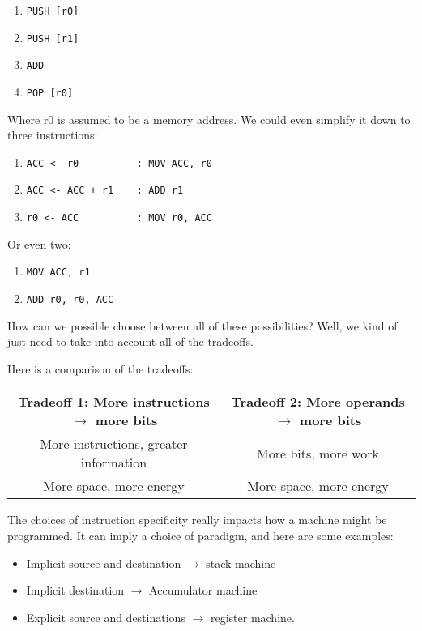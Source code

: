 \documentclass[11pt,a4paper,titlepage,dvipsnames,cmyk]{scrartcl}
\begin{document}
\begin{enumerate}
    \item \lstinline|PUSH [r0]| 
    \item \lstinline|PUSH [r1]| 
    \item \lstinline|ADD| 
    \item \lstinline|POP [r0]| 
\end{enumerate}

Where r0 is assumed to be a memory address. We could even simplify it down
to three instructions:

\begin{enumerate}
    \item \lstinline|ACC <- r0          : MOV ACC, r0|
    \item \lstinline|ACC <- ACC + r1    : ADD r1| 
    \item \lstinline|r0 <- ACC          : MOV r0, ACC| 
\end{enumerate}

Or even two:

\begin{enumerate}
    \item \lstinline|MOV ACC, r1| 
    \item \lstinline|ADD r0, r0, ACC| 
\end{enumerate}

How can we possible choose between all of these possibilities? Well, we
kind of just need to take into account all of the tradeoffs.

Here is a comparison of the tradeoffs:

\begin{center}
    \begin{tabular}{c|c}
        \textbf{Tradeoff 1: More instructions $\rightarrow$ more bits} &
        \textbf{Tradeoff 2: More operands $\rightarrow$ more bits} \\ \hhline{=|=}
        More instructions, greater information & More bits, more work \\
        \hline
        More space, more energy & More space, more energy
    \end{tabular}
\end{center}

The choices of instruction specificity really impacts how a machine might
be programmed. It can imply a choice of paradigm, and here are some
examples:
\begin{itemize}
    \item Implicit source and destination $\rightarrow$ stack machine
    \item Implicit destination $\rightarrow$ Accumulator machine
    \item Explicit source and destinations $\rightarrow$ register machine.
\end{itemize}
\end{document}
